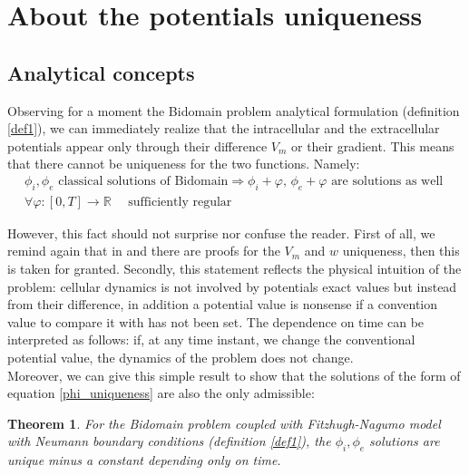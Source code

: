 \documentclass[a4paper,11pt]{article}
\newtheorem{theo}{Theorem}
\begin{document}
\section{About the potentials uniqueness}
\subsection{Analytical concepts}
\noindent Observing for a moment the Bidomain problem analytical formulation (definition \ref{def1}), we can immediately realize that the intracellular and the extracellular potentials appear only through their difference $V_m$ or their gradient. This means that there cannot be uniqueness for the two functions. Namely: \vspace{2mm}
\begin{equation}\label{phi_uniqueness}
\begin{gathered}
\phi_i,\phi_e \text{ classical solutions of Bidomain} \Rightarrow \phi_i+\varphi,\,\phi_e+\varphi \text{ are solutions as well } \\
 \forall \varphi: [0,T] \rightarrow \mathbb{R} \quad \text{ sufficiently regular}
\end{gathered}
\end{equation}

\vspace{4mm}
\noindent However, this fact should not surprise nor confuse the reader. First of all, we remind again that in \cite{bourgault} and \cite{colli_franzone} there are proofs for the $V_m$ and $w$ uniqueness, then this is taken for granted. Secondly, this statement reflects the physical intuition of the problem: cellular dynamics is not involved by potentials exact values but instead from their difference, in addition a potential value is nonsense if a convention value to compare it with has not been set. The dependence on time can be interpreted as follows: if, at any time instant, we change the conventional potential value, the dynamics of the problem does not change. \\

\noindent Moreover, we can give this simple result to show that the solutions of the form of equation \ref{phi_uniqueness} are also the only admissible:\\
\begin{theo}
	For the Bidomain problem coupled with Fitzhugh-Nagumo model with Neumann boundary conditions (definition \ref{def1}), the $\phi_i,\phi_e$ solutions are unique minus a constant depending only on time. 
\end{theo}
\end{document}
